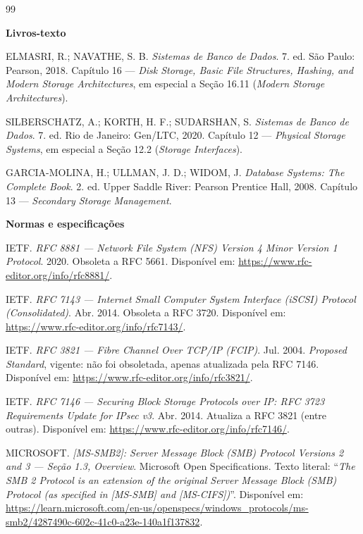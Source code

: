 \documentclass[11pt,a4paper]{article}
\begin{document}
\begin{thebibliography}{99}

\small

\item[]\textbf{Livros-texto}

 ELMASRI, R.; NAVATHE, S. B. \textit{Sistemas de Banco de Dados}. 7. ed.
São Paulo: Pearson, 2018. Capítulo 16 --- \textit{Disk Storage, Basic File Structures, Hashing, and
Modern Storage Architectures}, em especial a Seção 16.11 (\textit{Modern Storage Architectures}).

 SILBERSCHATZ, A.; KORTH, H. F.; SUDARSHAN, S. \textit{Sistemas de Banco
de Dados}. 7. ed. Rio de Janeiro: Gen/LTC, 2020. Capítulo 12 --- \textit{Physical Storage Systems},
em especial a Seção 12.2 (\textit{Storage Interfaces}).

 GARCIA-MOLINA, H.; ULLMAN, J. D.; WIDOM, J. \textit{Database Systems:
The Complete Book}. 2. ed. Upper Saddle River: Pearson Prentice Hall, 2008. Capítulo 13 ---
\textit{Secondary Storage Management}.

\smallskip
\item[]\textbf{Normas e especificações}

 IETF. \textit{RFC 8881 --- Network File System (NFS) Version 4 Minor Version 1
Protocol}. 2020. Obsoleta a RFC 5661. Disponível em: \url{https://www.rfc-editor.org/info/rfc8881/}.

 IETF. \textit{RFC 7143 --- Internet Small Computer System Interface (iSCSI)
Protocol (Consolidated)}. Abr. 2014. Obsoleta a RFC 3720. Disponível em:
\url{https://www.rfc-editor.org/info/rfc7143/}.

 IETF. \textit{RFC 3821 --- Fibre Channel Over TCP/IP (FCIP)}. Jul. 2004.
\emph{Proposed Standard}, vigente: não foi obsoletada, apenas atualizada pela RFC 7146. Disponível
em: \url{https://www.rfc-editor.org/info/rfc3821/}.

 IETF. \textit{RFC 7146 --- Securing Block Storage Protocols over IP: RFC 3723
Requirements Update for IPsec v3}. Abr. 2014. Atualiza a RFC 3821 (entre outras). Disponível em:
\url{https://www.rfc-editor.org/info/rfc7146/}.

 MICROSOFT. \textit{[MS-SMB2]: Server Message Block (SMB) Protocol Versions 2 and
3 --- Seção 1.3, Overview}. Microsoft Open Specifications. Texto literal: ``\textit{The SMB 2
Protocol is an extension of the original Server Message Block (SMB) Protocol (as specified in
[MS-SMB] and [MS-CIFS])}''. Disponível em:
\url{https://learn.microsoft.com/en-us/openspecs/windows_protocols/ms-smb2/4287490c-602c-41c0-a23e-140a1f137832}.


\end{thebibliography}
\end{document}
